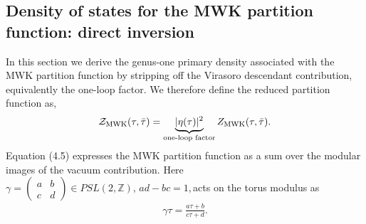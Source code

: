 \documentclass[12 pt]{article}
\begin{document}
\subsection{Density of states for the MWK partition function: direct inversion}

In this section we derive the genus-one primary density associated with the MWK partition function by stripping off the Virasoro descendant contribution, equivalently the one-loop factor. We therefore define the reduced partition function as,
\begin{align}
    \mathcal Z_{\rm MWK}(\tau,\bar\tau)
    =\underbrace{ |\eta(\tau)|^2 }_{\text{one-loop factor}}Z_{\rm MWK}(\tau,\bar\tau).\label{4.5t}
\end{align}
Equation (4.5) expresses the MWK partition function as a sum over the modular images of the vacuum contribution. Here
$
\gamma=\begin{pmatrix}a&b\\ c&d\end{pmatrix}\in PSL(2,\mathbb Z),\, ad-bc=1,
$acts on the torus modulus as
\begin{align}
\gamma\tau=\frac{a\tau+b}{c\tau+d}.
\end{align}
\end{document}
